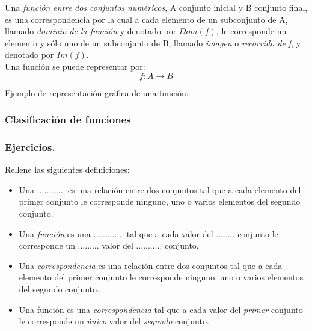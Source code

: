 
\begin{definition}
Una \emph{función entre dos conjuntos numéricos}, A conjunto inicial y B conjunto final, es una correspondencia por la cual a cada elemento de un subconjunto de A, llamado \emph{dominio de la función} y denotado por $Dom(f)$, le corresponde un elemento y sólo uno de un subconjunto de B, llamado \emph{imagen} o \emph{recorrido de f}, y denotado por $Im(f)$.\\
Una función se puede representar por:
$$f:A \rightarrow B$$
\end{definition}

Ejemplo de representación gráfica de una función:

\subsubsection{Clasificación de funciones}


\subsubsection{Ejercicios.}
\begin{ex}
	Rellene las siguientes definiciones:
		\begin{itemize}
			\item Una ............ es una relación entre dos conjuntos tal que a cada elemento del primer conjunto le corresponde ninguno, uno o varios elementos del segundo conjunto.
			\item Una \emph{función} es una ............. tal que a cada valor del ........ conjunto le corresponde un ......... valor del ........... conjunto.	
		\end{itemize}
	\begin{sol}
		\begin{itemize}
			\item Una \emph{correspondencia} es una relación entre dos conjuntos tal que a cada elemento del primer conjunto le corresponde ninguno, uno o varios elementos del segundo conjunto.
			\item Una función es una \emph{correspondencia} tal que a cada valor del \emph{primer} conjunto le corresponde un \emph{único} valor del \emph{segundo} conjunto. 
		\end{itemize}
	\end{sol}
\end{ex}


